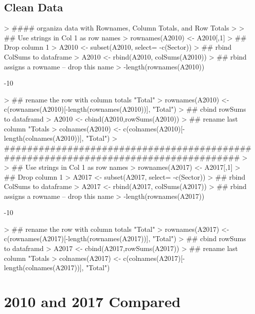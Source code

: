 \documentclass[letterpaper]{article}
\begin{document}
\subsection{Clean Data}
\begin{Schunk}
\begin{Sinput}
> #### organiza data with Rownames, Column Totals, and Row Totals
> 
> ## Use strings in Col 1 as row names
> rownames(A2010) <- A2010[,1]
> ## Drop column 1
> A2010 <-  subset(A2010, select= -c(Sector))
> ## rbind ColSums to dataframe
> A2010 <- rbind(A2010, colSums(A2010))
> ## rbind assigns a rowname -- drop this name
> -length(rownames(A2010))  
\end{Sinput}
\begin{Soutput}
[1] -10
\end{Soutput}
\begin{Sinput}
> ## rename the row with column totals "Total"
> rownames(A2010) <- c(rownames(A2010)[-length(rownames(A2010))], "Total")
> ## cbind rowSums to dataframd
> A2010 <- cbind(A2010,rowSums(A2010))
> ## rename last column "Totals
> colnames(A2010) <- c(colnames(A2010)[-length(colnames(A2010))], "Total")
> ####################################################################################
> 
> ## Use strings in Col 1 as row names
> rownames(A2017) <- A2017[,1]
> ## Drop column 1
> A2017 <-  subset(A2017, select= -c(Sector))
> ## rbind ColSums to dataframe
> A2017 <- rbind(A2017, colSums(A2017))
> ## rbind assigns a rowname -- drop this name
> -length(rownames(A2017))  
\end{Sinput}
\begin{Soutput}
[1] -10
\end{Soutput}
\begin{Sinput}
> ## rename the row with column totals "Total"
> rownames(A2017) <- c(rownames(A2017)[-length(rownames(A2017))], "Total")
> ## cbind rowSums to dataframd
> A2017 <- cbind(A2017,rowSums(A2017))
> ## rename last column "Totals
> colnames(A2017) <- c(colnames(A2017)[-length(colnames(A2017))], "Total")
\end{Sinput}
\end{Schunk}

\section{2010 and 2017 Compared}
\end{document}
